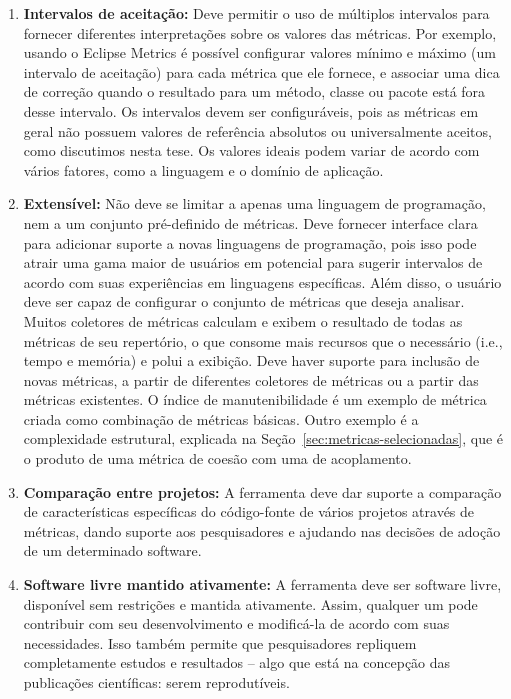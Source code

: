 \begin{enumerate}

\item \textbf{Intervalos de aceitação:} Deve permitir o uso de múltiplos intervalos
para fornecer diferentes interpretações sobre os valores das métricas.
%
Por exemplo, usando o Eclipse Metrics \citep{Metrics2005} é possível
configurar valores mínimo e máximo (um intervalo de aceitação) para cada métrica
que ele fornece, e associar uma dica de correção quando o resultado para um
método, classe ou pacote está fora desse intervalo.
%
Os intervalos devem ser configuráveis, pois as métricas em geral não possuem
valores de referência absolutos ou universalmente aceitos, como discutimos nesta
tese.
%
Os valores ideais podem variar de acordo com vários fatores, como a linguagem e
o domínio de aplicação.
 
  \item \textbf{Extensível:} Não deve se limitar a apenas uma linguagem de
programação, nem a um conjunto pré-definido de métricas.
%
Deve fornecer interface clara para adicionar suporte a novas linguagens de
programação, pois isso pode atrair uma gama maior de usuários em potencial para
sugerir intervalos de acordo com suas experiências em linguagens específicas.
%
Além disso, o usuário deve ser capaz de configurar o conjunto de métricas que
deseja analisar.
%
Muitos coletores de métricas calculam e exibem o resultado de todas as métricas
de seu repertório, o que consome  mais recursos que o necessário (i.e., tempo e
memória) e polui a exibição.
%
Deve haver suporte para inclusão de novas métricas, a partir de diferentes
coletores de métricas ou a partir das métricas existentes.
%
O índice de manutenibilidade \citep{VanDoren1997} é um exemplo de métrica criada
como combinação de métricas básicas.
%
Outro exemplo é a complexidade estrutural, explicada na
Seção~\ref{sec:metricas-selecionadas}, que é o produto de uma métrica de
coesão com uma de acoplamento.

\item \textbf{Comparação entre projetos:} A ferramenta deve dar suporte a
comparação de características específicas do código-fonte de vários projetos
através de métricas, dando suporte aos pesquisadores e ajudando nas decisões de
adoção de um determinado software.

\item \textbf{Software livre mantido ativamente:} A ferramenta deve ser
software livre, disponível sem restrições e mantida ativamente.
%
Assim, qualquer um pode contribuir com seu desenvolvimento e modificá-la de
acordo com suas necessidades.
%
Isso também permite que pesquisadores repliquem completamente estudos e
resultados -- algo que está na concepção das publicações científicas: serem
reprodutíveis.

\end{enumerate}

